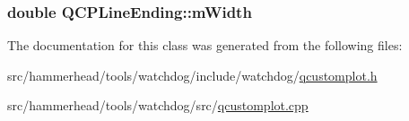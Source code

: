 \subsubsection[{\texorpdfstring{m\+Width}{mWidth}}]{\setlength{\rightskip}{0pt plus 5cm}double Q\+C\+P\+Line\+Ending\+::m\+Width\hspace{0.3cm}{\ttfamily [protected]}}\hypertarget{classQCPLineEnding_aca89d21341133c20dc6825c33a5eac48}{}\label{classQCPLineEnding_aca89d21341133c20dc6825c33a5eac48}


The documentation for this class was generated from the following files\+:\begin{DoxyCompactItemize}
\item 
src/hammerhead/tools/watchdog/include/watchdog/\hyperlink{qcustomplot_8h}{qcustomplot.\+h}\item 
src/hammerhead/tools/watchdog/src/\hyperlink{qcustomplot_8cpp}{qcustomplot.\+cpp}\end{DoxyCompactItemize}
